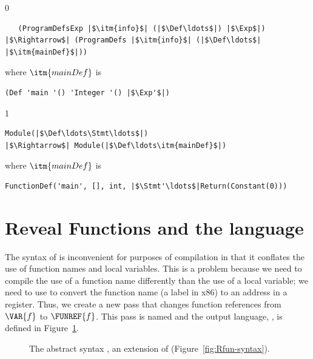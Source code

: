 \documentclass[7x10]{TimesAPriori_MIT}%
\newcommand{\gray}[1]{{\color{gray} #1}}
\def\racketEd{0}
\def\pythonEd{1}
\def\edition{1}
\begin{document}
{\if\edition\racketEd  
\begin{lstlisting}
   (ProgramDefsExp |$\itm{info}$| (|$\Def\ldots$|) |$\Exp$|)
|$\Rightarrow$| (ProgramDefs |$\itm{info}$| (|$\Def\ldots$| |$\itm{mainDef}$|))
\end{lstlisting}
where $\itm{mainDef}$ is
\begin{lstlisting}
(Def 'main '() 'Integer '() |$\Exp'$|)
\end{lstlisting}
\fi}
{\if\edition\pythonEd
\begin{lstlisting}
Module(|$\Def\ldots\Stmt\ldots$|)
|$\Rightarrow$| Module(|$\Def\ldots\itm{mainDef}$|)
\end{lstlisting}
where $\itm{mainDef}$ is
\begin{lstlisting}
FunctionDef('main', [], int, |$\Stmt'\ldots$|Return(Constant(0)))
\end{lstlisting}
\fi}

\section{Reveal Functions and the \LangFunRef{} language}
\label{sec:reveal-functions-r4}

The syntax of \LangFun{} is inconvenient for purposes of compilation
in that it conflates the use of function names and local
variables. This is a problem because we need to compile the use of a
function name differently than the use of a local variable; we need to
use  to convert the function name (a label in x86) to an
address in a register.  Thus, we create a new pass that changes
function references from $\VAR{f}$ to $\FUNREF{f}$. This pass is named
 and the output language, \LangFunRef{}, is
defined in Figure~\ref{fig:f1-syntax}.

\begin{figure}[tp]
\centering
\fbox{
\begin{minipage}{0.96\textwidth}
{\if\edition\racketEd   
\[
\begin{array}{lcl}
\Exp &::=& \ldots \MID \FUNREF{\Var}\\
 \Def &::=& \gray{ \FUNDEF{\Var}{([\Var \code{:} \Type]\ldots)}{\Type}{\code{'()}}{\Exp} }\\
  \LangFunRefM{} &::=& \PROGRAMDEFS{\code{'()}}{\LP \Def\ldots \RP}
\end{array}
\]
\fi}
{\if\edition\pythonEd  
\[
\begin{array}{lcl}
\Exp &::=& \FUNREF{\Var}\\
  \LangFunM{} &::=& \PROGRAM{}{\LS \Def \code{,} \ldots \RS}
\end{array}
\]
\fi}
\end{minipage}
}
\caption{The abstract syntax \LangFunRef{}, an extension of \LangFun{}
  (Figure~\ref{fig:Rfun-syntax}).}
\label{fig:f1-syntax}
\end{figure}
\end{document}
